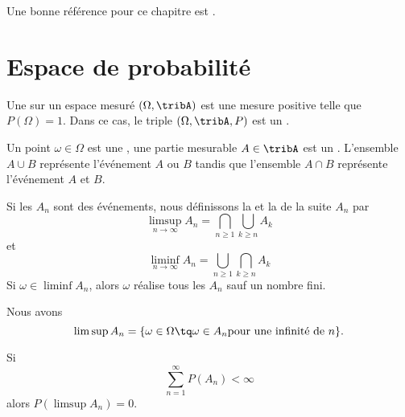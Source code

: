
Une bonne référence pour ce chapitre est \cite{ProbaDanielLi}.

\section{Espace de probabilité}

Une  sur un espace mesuré \( (\Omega,\tribA)\) est une mesure positive telle que \( P(\Omega)=1\). Dans ce cas, le triple \( (\Omega,\tribA,P)\) est un .

Un point \( \omega\in\Omega\) est une , une partie mesurable \( A\in\tribA\) est un . L'ensemble \( A\cup B\) représente l'événement \( A\) ou \( B\) tandis que l'ensemble \( A\cap B\) représente l'événement \( A\) et \( B\).


Si les \( A_n\) sont des événements, nous définissons la  et la  de la suite \( A_n\) par
\begin{equation}
    \limsup_{n\to\infty}A_n=\bigcap_{n\geq 1}\bigcup_{k\geq n}A_k
\end{equation}
et
\begin{equation}
    \liminf_{n\to\infty}A_n=\bigcup_{n\geq 1}\bigcap_{k\geq n}A_k
\end{equation}
Si \( \omega\in\liminf A_n\), alors \( \omega\) réalise tous les \( A_n\) sauf un nombre fini.

Nous avons
\begin{equation}
    \limsup A_n=\{ \omega\in\Omega\tq \omega\in A_n\text{pour une infinité de \( n\)} \}.
\end{equation}

\begin{theorem}
    Si
    \begin{equation}
        \sum_{n=1}^{\infty}P(A_n)<\infty
    \end{equation}
    alors \( P(\limsup A_n)=0\).
\end{theorem}

